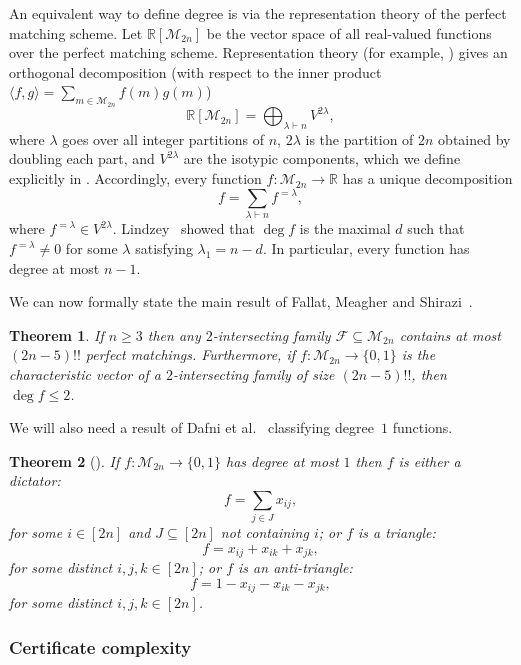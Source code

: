 \documentclass[10pt,a4paper]{amsart}
\newtheorem{theorem}{Theorem}[section]
\theoremstyle{definition}
\providecommand{\cM}{\mathcal{M}}
\begin{document}
An equivalent way to define degree is via the representation theory of the perfect matching scheme. Let $\mathbb{R}[\cM_{2n}]$ be the vector space of all real-valued functions over the perfect matching scheme. Representation theory (for example, \cite[Chapter 11]{CSST08}) gives an orthogonal decomposition (with respect to the inner product $\langle f, g \rangle = \sum_{m \in \cM_{2n}} f(m) g(m)$)
\[
 \mathbb{R}[\cM_{2n}] = \bigoplus_{\lambda \vdash n} V^{2\lambda},
\]
where $\lambda$ goes over all integer partitions of $n$, $2\lambda$ is the partition of $2n$ obtained by doubling each part, and $V^{2\lambda}$ are the isotypic components, which we define explicitly in . Accordingly, every function $f\colon \cM_{2n} \to \mathbb{R}$ has a unique decomposition
\[
 f = \sum_{\lambda \vdash n} f^{=\lambda},
\]
where $f^{=\lambda} \in V^{2\lambda}$. Lindzey~\cite[Theorem 5.1.1]{LindzeyThesis} showed that $\deg f$ is the maximal $d$ such that $f^{=\lambda} \neq 0$ for some $\lambda$ satisfying $\lambda_1 = n - d$. In particular, every function has degree at most $n - 1$.

We can now formally state the main result of Fallat, Meagher and Shirazi~\cite[Theorem 4.13]{FMS}.

\begin{theorem} \label{thm:FMS}
If $n \geq 3$ then any $2$-intersecting family $\mathcal{F} \subseteq \cM_{2n}$ contains at most $(2n-5)!!$ perfect matchings. Furthermore, if $f\colon \cM_{2n} \to \{0,1\}$ is the characteristic vector of a $2$-intersecting family of size $(2n-5)!!$, then $\deg f \leq 2$.
\end{theorem}

We will also need a result of Dafni et al.~\cite{DFLLV} classifying degree~$1$ functions.

\begin{theorem}[{\cite[Theorem 6.2]{DFLLV}}] \label{thm:degree1-classification-pms}
If $f\colon \cM_{2n} \to \{0,1\}$ has degree at most $1$ then $f$ is either a \emph{dictator}:
\[
 f = \sum_{j \in J} x_{ij},
\]
for some $i \in [2n]$ and $J \subseteq [2n]$ not containing $i$; or $f$ is a \emph{triangle}:
\[
 f = x_{ij} + x_{ik} + x_{jk},
\]
for some distinct $i,j,k \in [2n]$; or $f$ is an \emph{anti-triangle}:
\[
 f = 1 - x_{ij} - x_{ik} - x_{jk},
\]
for some distinct $i,j,k \in [2n]$.
\end{theorem}

\subsubsection{Certificate complexity} \label{sec:certificate-pms}
\end{document}
